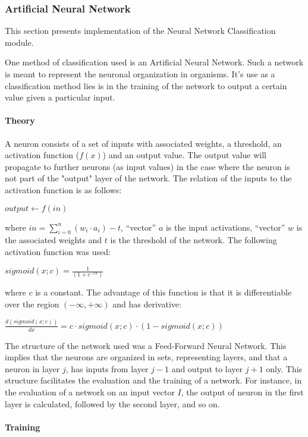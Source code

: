\subsubsection{Artificial Neural Network}

This section presents implementation of the Neural Network Classification module.

One method of classification used is an Artificial Neural
Network. Such a network is meant to represent the neuronal
organization in organisms. It's use as a classification method lies is
in the training of the network to output a certain value given a
particular input.

\paragraph{Theory}

A neuron consists of a set of inputs with associated weights, a
threshold, an activation function ($f(x)$) and an output value. The
output value will propagate to further neurons (as input values) in
the case where the neuron is not part of the "output" layer of the
network. The relation of the inputs to the activation function is as
follows:

$output \longleftarrow f(in)$

where $in = \displaystyle\sum_{i=0}^{n}(w_{i} \cdot a_{i}) - t$, ``vector'' $a$ is the
input activations, ``vector'' $w$ is the associated weights and $t$ is the
threshold of the network. The following activation function was used:

$sigmoid(x; c) = \frac{1}{(1 + e^{-cx})}$

where $c$ is a constant. The advantage of this function is that it is
differentiable over the region $(-\infty,+\infty)$ and has derivative:

$\frac{d(sigmoid(x; c))}{dx} = c \cdot sigmoid(x; c) \cdot (1 - sigmoid(x; c))$

The structure of the network used was a Feed-Forward Neural
Network. This implies that the neurons are organized in sets,
representing layers, and that a neuron in layer $j$, has inputs from
layer $j-1$ and output to layer $j+1$ only. This structure facilitates the
evaluation and the training of a network. For instance, in the
evaluation of a network on an input vector $I$, the output of neuron in
the first layer is calculated, followed by the second layer, and so
on.

\paragraph{Training}

